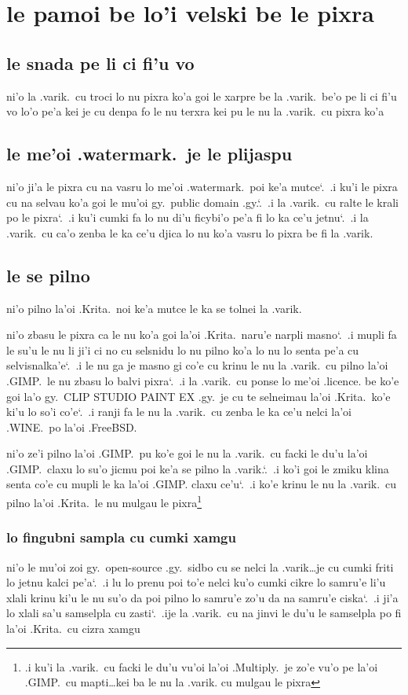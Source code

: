 \documentclass{report}
\newcommand\sds{\spacefactor\sfcode`.\ \space}
\begin{document}
\section{le pamoi be lo'i velski be le pixra}
\subsection{le snada pe li ci fi'u vo}
ni'o la .varik.\ cu troci lo nu pixra ko'a goi le xarpre be la .varik.\ be'o pe li ci fi'u vo lo'o pe'a kei je cu denpa fo le nu terxra kei pu le nu la .varik.\ cu pixra ko'a
\subsection{le me'oi .watermark.\ je le plijaspu}
ni'o ji'a le pixra cu na vasru lo me'oi .watermark.\ poi ke'a mutce\sds  .i ku'i le pixra cu na selvau ko'a goi le mu'oi gy.\ public domain .gy.\sds  .i la .varik.\ cu ralte le krali po le pixra\sds  .i ku'i cumki fa lo nu di'u ficybi'o pe'a fi lo ka ce'u jetnu\sds  .i la .varik.\ cu ca'o zenba le ka ce'u djica lo nu ko'a vasru lo pixra be fi la .varik.

\subsection{le se pilno}
ni'o pilno la'oi .Krita.\ noi ke'a mutce le ka se tolnei la .varik.

ni'o zbasu le pixra ca le nu ko'a goi la'oi .Krita.\ naru'e narpli masno\sds  .i mupli fa le su'u le nu li ji'i ci no cu selsnidu lo nu pilno ko'a lo nu lo senta pe'a cu selvisnalka'e\sds  .i le nu ga je masno gi co'e cu krinu le nu la .varik.\ cu pilno la'oi .GIMP.\ le nu zbasu lo balvi pixra\sds  .i la .varik.\ cu ponse lo me'oi .licence. be ko'e goi la'o gy.\ CLIP STUDIO PAINT EX .gy.\ je cu te selneimau la'oi .Krita.\ ko'e ki'u lo so'i co'e\sds  .i ranji fa le nu la .varik.\ cu zenba le ka ce'u nelci la'oi .WINE.\ po la'oi .FreeBSD.

ni'o ze'i pilno la'oi .GIMP.\ pu ko'e goi le nu la .varik.\ cu facki le du'u la'oi .GIMP.\ claxu lo su'o jicmu poi ke'a se pilno la .varik.\sds  .i ko'i goi le zmiku klina senta co'e cu mupli le ka la'oi .GIMP. claxu ce'u\sds  .i ko'e krinu le nu la .varik.\ cu pilno la'oi .Krita.\ le nu mulgau le pixra\footnote{.i ku'i la .varik.\ cu facki le du'u vu'oi la'oi .Multiply.\ je zo'e vu'o pe la'oi .GIMP.\ cu mapti\ldots kei ba le nu la .varik. cu mulgau le pixra}

\subsubsection{lo fingubni sampla cu cumki xamgu}
ni'o le mu'oi zoi gy.\ open-source .gy.\ sidbo cu se nelci la .varik\ldots je cu cumki friti lo jetnu kalci pe'a\sds  .i lu lo prenu poi to'e nelci ku'o cumki cikre lo samru'e li'u xlali krinu ki'u le nu su'o da poi pilno lo samru'e zo'u da na samru'e ciska\sds  .i ji'a lo xlali sa'u samselpla cu zasti\sds  .ije la .varik.\ cu na jinvi le du'u le samselpla po fi la'oi .Krita.\ cu cizra xamgu
\end{document}
